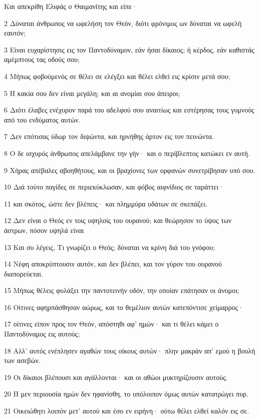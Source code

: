 \par Και απεκρίθη Ελιφάς ο Θαιμανίτης και είπε·
\par 2 Δύναται άνθρωπος να ωφελήση τον Θεόν, διότι φρόνιμος ων δύναται να ωφελή εαυτόν;
\par 3 Είναι ευχαρίστησις εις τον Παντοδύναμον, εάν ήσαι δίκαιος; ή κέρδος, εάν καθιστάς αμέμπτους τας οδούς σου;
\par 4 Μήπως φοβούμενός σε θέλει σε ελέγξει και θέλει ελθεί εις κρίσιν μετά σου;
\par 5 Η κακία σου δεν είναι μεγάλη; και αι ανομίαι σου άπειροι;
\par 6 Διότι έλαβες ενέχυρον παρά του αδελφού σου αναιτίως και εστέρησας τους γυμνούς από του ενδύματος αυτών.
\par 7 Δεν επότισας ύδωρ τον διψώντα, και ηρνήθης άρτον εις τον πεινώντα.
\par 8 Ο δε ισχυρός άνθρωπος απελάμβανε την γήν· και ο περίβλεπτος κατώκει εν αυτή.
\par 9 Χήρας απέβαλες αβοηθήτους, και οι βραχίονες των ορφανών συνετρίβησαν υπό σου.
\par 10 Διά τούτο παγίδες σε περιεκύκλωσαν, και φόβος αιφνίδιος σε ταράττει·
\par 11 και σκότος, ώστε δεν βλέπεις· και πλημμύρα υδάτων σε σκεπάζει.
\par 12 Δεν είναι ο Θεός εν τοις υψηλοίς του ουρανού; και θεώρησον το ύψος των άστρων, πόσον υψηλά είναι
\par 13 Και συ λέγεις, Τι γνωρίζει ο Θεός; δύναται να κρίνη διά του γνόφου;
\par 14 Νέφη αποκρύπτουσιν αυτόν, και δεν βλέπει, και τον γύρον του ουρανού διαπορεύεται.
\par 15 Μήπως θέλεις φυλάξει την παντοτεινήν οδόν, την οποίαν επάτησαν οι άνομοι;
\par 16 Οίτινες αφηρπάσθησαν αώρως, και το θεμέλιον αυτών κατεπόντισε χείμαρρος·
\par 17 οίτινες είπον προς τον Θεόν, απόστηθι αφ' ημών· και τι θέλει κάμει ο Παντοδύναμος εις αυτούς;
\par 18 Αλλ' αυτός ενέπλησεν αγαθών τους οίκους αυτών· πλην μακράν απ' εμού η βουλή των ασεβών.
\par 19 Οι δίκαιοι βλέπουσι και αγάλλονται· και οι αθώοι μυκτηρίζουσιν αυτούς.
\par 20 Η μεν περιουσία ημών δεν ηφανίσθη, το υπόλοιπον όμως αυτών κατατρώγει πυρ.
\par 21 Οικειώθητι λοιπόν μετ' αυτού και έσο εν ειρήνη· ούτω θέλει ελθεί καλόν εις σε.
